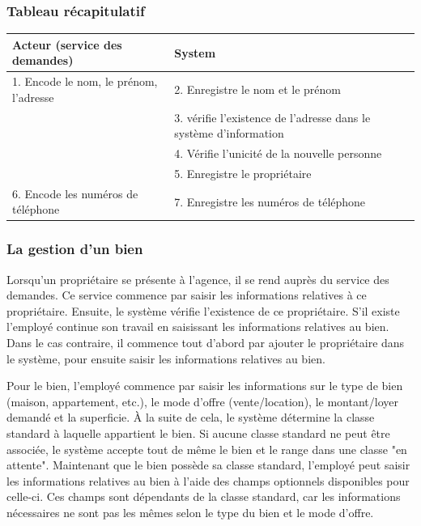 \subsubsection*{Tableau récapitulatif}
\begin{longtable}{|p{7.5cm}|p{7.5cm}|}
\hline
Acteur (service des demandes) & System\\
\hline
1. Encode le nom, le prénom, l'adresse & 2. Enregistre le nom et le prénom\\
& 3. vérifie l'existence de l'adresse dans le système d'information\\
& 4. Vérifie l'unicité de la nouvelle personne\\
& 5. Enregistre le propriétaire\\
6. Encode les numéros de téléphone  & 7. Enregistre les numéros de téléphone\\
\hline
\end{longtable}
\subsubsection{La gestion d'un bien}
Lorsqu'un propriétaire se présente à l'agence, il se rend auprès du service des demandes.
Ce service commence par saisir les informations relatives à ce propriétaire.
Ensuite, le système vérifie l'existence de ce propriétaire. S'il existe l'employé continue son travail en saisissant les informations relatives au bien. Dans le cas contraire, il commence tout d'abord par ajouter le propriétaire dans le système, pour ensuite saisir les informations relatives au bien.

Pour le bien, l'employé commence par saisir les informations sur le type de bien (maison, appartement, etc.), le mode d'offre (vente/location), le montant/loyer demandé et la superficie.
À la suite de cela, le système détermine la classe standard à laquelle appartient le bien.
Si aucune classe standard ne peut être associée, le système accepte tout de même le bien et le range dans une classe "en attente".
Maintenant que le bien possède sa classe standard, l'employé peut saisir les informations relatives au bien à l'aide des champs optionnels disponibles pour celle-ci.
Ces champs sont dépendants de la classe standard, car les informations nécessaires ne sont pas les mêmes selon le type du bien et le mode d'offre.

